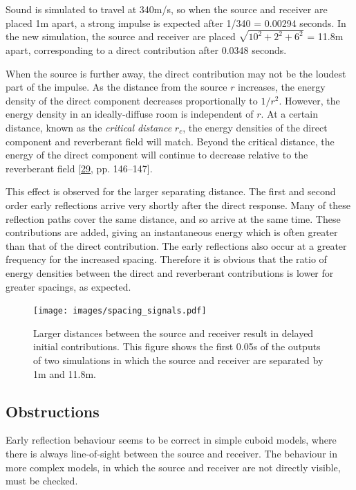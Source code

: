 \documentclass[]{scrreprt}
\begin{document}
Sound is simulated to travel at 340m/s, so when the source and receiver
are placed 1m apart, a strong impulse is expected after 1/340 = 0.00294
seconds. In the new simulation, the source and receiver are placed
\(\sqrt{10^2 + 2^2 + 6^2}\) = 11.8m apart, corresponding to a direct
contribution after 0.0348 seconds.

When the source is further away, the direct contribution may not be the
loudest part of the impulse. As the distance from the source \(r\)
increases, the energy density of the direct component decreases
proportionally to \(1/r^2\). However, the energy density in an
ideally-diffuse room is independent of \(r\). At a certain distance,
known as the \emph{critical distance} \(r_c\), the energy densities of
the direct component and reverberant field will match. Beyond the
critical distance, the energy of the direct component will continue to
decrease relative to the reverberant field
{[}\protect\hyperlink{ref-kuttruffux5froomux5f2009}{29}, pp.
146--147{]}.

This effect is observed for the larger separating distance. The first
and second order early reflections arrive very shortly after the direct
response. Many of these reflection paths cover the same distance, and so
arrive at the same time. These contributions are added, giving an
instantaneous energy which is often greater than that of the direct
contribution. The early reflections also occur at a greater frequency
for the increased spacing. Therefore it is obvious that the ratio of
energy densities between the direct and reverberant contributions is
lower for greater spacings, as expected.

\begin{figure}[htbp]
\centering
\texttt{[image: images/spacing\_signals.pdf]}
\caption{Larger distances between the source and receiver result in
delayed initial contributions. This figure shows the first 0.05s of the
outputs of two simulations in which the source and receiver are
separated by 1m and 11.8m.\label{fig:spacing_signals}}
\end{figure}

\subsection{Obstructions}\label{obstructions}

Early reflection behaviour seems to be correct in simple cuboid models,
where there is always line-of-sight between the source and receiver. The
behaviour in more complex models, in which the source and receiver are
not directly visible, must be checked.
\end{document}
